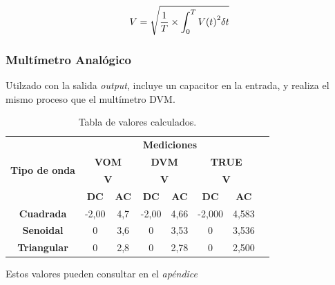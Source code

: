 \documentclass{article}
\begin{document}
\begin{center}
\begin{equation}
V = \sqrt{ {{1}\over{T}} \times \int_{0}^{T} {V(t)}^2 \delta t}
\end{equation}
\end{center}
\bigskip


\subsubsection{Multímetro Analógico}

Utilzado con la salida \textit{output}, incluye un capacitor en la entrada, y realiza el mismo proceso que el multímetro DVM.\bigskip



\newpage
\begin{table}[!hbt]
	\begin{center}

		\begin{tabular}{|c|c|c|c|c|c|c|c|} \hline
			\multirow{4}{*}{\textbf{Tipo de onda}}

			& \multicolumn{6}{c|}{\textbf{Mediciones}} \\\cline{2-7}
			& \multicolumn{2}{c|}{\textbf{VOM}} & \multicolumn{2}{c|}{\textbf{DVM}} & \multicolumn{2}{c|}{\textbf{TRUE}} \\\cline{2-7}
			& \multicolumn{2}{c|}{\textbf{V}} & \multicolumn{2}{c|}{\textbf{V}} & \multicolumn{2}{c|}{\textbf{V}} \\\cline{2-7}
			& \textbf{DC} & \textbf{AC} & \textbf{DC} & \textbf{AC} & \textbf{DC} & \textbf{AC} \\\hline
			\textbf{Cuadrada} & -2,00 & 4,7  & -2,00 & 4,66 & -2,000 & 4,583 \\\hline
			\textbf{Senoidal} & 0 & 3,6 & 0 & 3,53 & 0 &  3,536 \\\hline
			\textbf{Triangular} & 0 & 2,8 & 0 & 2,78 & 0 & 2,500 \\\hline
		\end{tabular}

	\caption{Tabla de valores calculados.}
	\end{center}
\end{table}
\medskip

Estos valores pueden consultar en el \textit{apéndice}\\\bigskip
\end{document}
